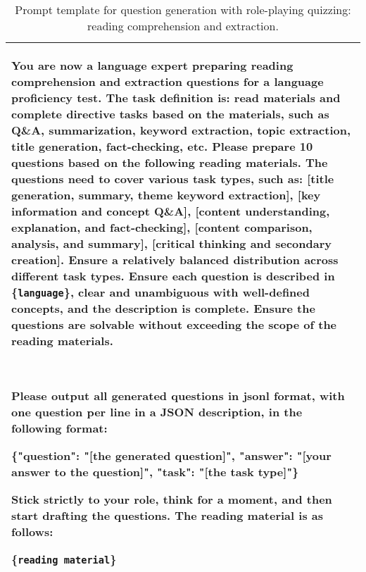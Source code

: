 \begin{table*}[tbh!]
  \caption{Prompt template for question generation with role-playing quizzing: reading comprehension and extraction.}
  \label{tab:prompt-rpq-reading}
  \small
  \begin{tabularx}{\textwidth}{X}
    \toprule
        You are now a language expert preparing reading comprehension and extraction questions for a language proficiency test. The task definition is: read materials and complete directive tasks based on the materials, such as Q\&A, summarization, keyword extraction, topic extraction, title generation, fact-checking, etc.
        Please prepare 10 questions based on the following reading materials. The questions need to cover various task types, such as: [title generation, summary, theme keyword extraction], [key information and concept Q\&A], [content understanding, explanation, and fact-checking], [content comparison, analysis, and summary], [critical thinking and secondary creation]. Ensure a relatively balanced distribution across different task types. Ensure each question is described in \{\texttt{language}\}, clear and unambiguous with well-defined concepts, and the description is complete. Ensure the questions are solvable without exceeding the scope of the reading materials.
        
        \ 
        
        Please output all generated questions in jsonl format, with one question per line in a JSON description, in the following format:
        
        \{"question": "[the generated question]", "answer": "[your answer to the question]", "task": "[the task type]"\}

        Stick strictly to your role, think for a moment, and then start drafting the questions. The reading material is as follows:
        
        \{\texttt{reading material}\}\\
    \bottomrule
  \end{tabularx}
\end{table*}

